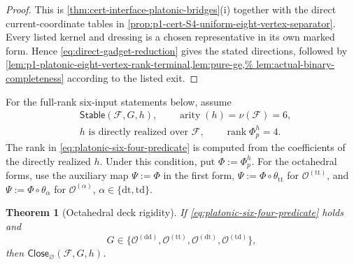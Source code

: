 \documentclass[11pt,letterpaper,onecolumn]{article}
\theoremstyle{plain}
\newtheorem{theorem}{Theorem}[section]
\theoremstyle{definition}
\theoremstyle{remark}
\newcommand{\cF}{\mathcal F}
\newcommand{\OctDD}{{\mathcal O^{(\mathrm{dd})}}}
\newcommand{\OctTT}{{\mathcal O^{(\mathrm{tt})}}}
\newcommand{\OctDT}{{\mathcal O^{(\mathrm{dt})}}}
\newcommand{\OctTD}{{\mathcal O^{(\mathrm{td})}}}
\newcommand{\OctForm}[1]{{\mathcal O^{(#1)}}}
\newcommand{\Stable}{\mathsf{Stable}}
\newcommand{\Close}{\mathsf{Close}}
\newcommand{\rank}{\operatorname{rank}}
\newcommand{\arity}{\operatorname{arity}}
\begin{document}
\begin{proof}
This is \cref{thm:cert-interface-platonic-bridges}\textnormal{(i)} together
with the direct current-coordinate tables in
\cref{prop:p1-cert-S4-uniform-eight-vertex-separator}.  Every listed kernel
and dressing is a chosen representative in its own marked form. Hence
\cref{eq:direct-gadget-reduction} gives the stated directions, followed by
\cref{lem:p1-platonic-eight-vertex-rank-terminal,lem:pure-ge,%
lem:actual-binary-completeness} according to the listed exit.
\end{proof}

For the full-rank six-input statements below, assume
\begin{equation}
 \begin{aligned}
 &\Stable(\cF,G,h),\qquad \arity(h)=\nu(\cF)=6,\\
 &h\text{ is directly realized over }\cF,\qquad \rank\Phi_p^h=4.
 \end{aligned}
 \label{eq:platonic-six-four-predicate}
\end{equation}
The rank in \cref{eq:platonic-six-four-predicate} is computed from
the coefficients of the directly realized \(h\). Under this condition,
put \(\Phi:=\Phi_p^h\). For the octahedral forms, use the auxiliary map
\(\Psi:=\Phi\) in the first form,
\(\Psi:=\Phi\circ\theta_{\mathrm{tt}}\) for \(\OctTT\), and
\(\Psi:=\Phi\circ\theta_\alpha\) for \(\OctForm{\alpha}\),
\(\alpha\in\{\mathrm{dt},\mathrm{td}\}\).

\begin{theorem}[Octahedral deck rigidity]
\label{thm:octahedral-deck-rigidity}
If \cref{eq:platonic-six-four-predicate} holds and
\[
 G\in\{\OctDD,\OctTT,\OctDT,\OctTD\},
\]
then \(\Close_{\varnothing}(\cF,G,h)\).
\end{theorem}
\end{document}
